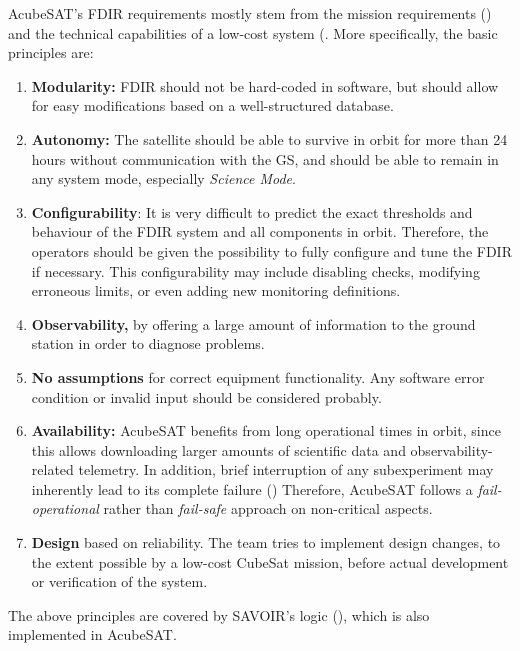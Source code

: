 \documentclass[a4paper,nobib]{tufte-book}
\begin{document}
AcubeSAT's \acs{FDIR} requirements mostly stem from the mission requirements () and the technical capabilities of a low-cost system (. More specifically, the basic principles are:
\begin{enumerate}
	\item \textbf{Modularity:} \acs{FDIR} should not be hard-coded in software, but should allow for easy modifications based on a well-structured database.
		\item \textbf{Autonomy:} The satellite should be able to survive in orbit for more than \SI{24}{} hours without communication with the \acs{GS}, and should be able to remain in any system mode, especially \emph{Science Mode}.
		\item \textbf{Configurability}: It is very difficult to predict the exact thresholds and behaviour of the \acs{FDIR} system and all components in orbit. Therefore, the operators should be given the possibility to fully configure and tune the \acs{FDIR} if necessary. This configurability may include disabling checks, modifying erroneous limits, or even adding new monitoring definitions.
		\item \textbf{Observability,} by offering a large amount of information to the ground station in order to diagnose problems.
		\item \textbf{No assumptions} for correct equipment functionality. Any software error condition or invalid input should be considered probably.
		\item \textbf{Availability:} AcubeSAT benefits from long operational times in orbit, since this allows downloading larger amounts of scientific data and observability-related telemetry. In addition, brief interruption of any subexperiment may inherently lead to its complete failure () Therefore, AcubeSAT follows a \emph{fail-operational} rather than \emph{fail-safe} approach on non-critical aspects.
		\item \textbf{Design} based on reliability. The team tries to implement design changes, to the extent possible by a low-cost CubeSat mission, before actual development or verification of the system.
	\end{enumerate}
	
The above principles are covered by \acs{SAVOIR}'s logic (), which is also implemented in AcubeSAT.
\end{document}
